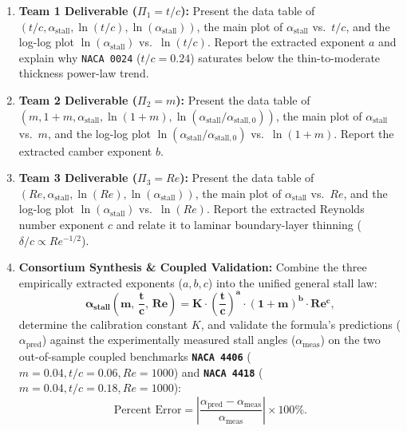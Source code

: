 \documentclass[11pt,a4paper]{article}
\begin{document}
\begin{enumerate}[leftmargin=*, itemsep=4pt]
    \item \textbf{Team 1 Deliverable ($\Pi_1 = t/c$):}
    Present the data table of $(t/c, \alpha_{\text{stall}}, \ln(t/c), \ln(\alpha_{\text{stall}}))$, the main plot of $\alpha_{\text{stall}}$ vs.\ $t/c$, and the log-log plot $\ln(\alpha_{\text{stall}})$ vs.\ $\ln(t/c)$. Report the extracted exponent $a$ and explain why \texttt{NACA 0024} ($t/c = 0.24$) saturates below the thin-to-moderate thickness power-law trend.

    \item \textbf{Team 2 Deliverable ($\Pi_2 = m$):}
    Present the data table of $(m, 1+m, \alpha_{\text{stall}}, \ln(1+m), \ln(\alpha_{\text{stall}}/\alpha_{\text{stall},0}))$, the main plot of $\alpha_{\text{stall}}$ vs.\ $m$, and the log-log plot $\ln(\alpha_{\text{stall}}/\alpha_{\text{stall},0})$ vs.\ $\ln(1+m)$. Report the extracted camber exponent $b$.

    \item \textbf{Team 3 Deliverable ($\Pi_3 = Re$):}
    Present the data table of $(Re, \alpha_{\text{stall}}, \ln(Re), \ln(\alpha_{\text{stall}}))$, the main plot of $\alpha_{\text{stall}}$ vs.\ $Re$, and the log-log plot $\ln(\alpha_{\text{stall}})$ vs.\ $\ln(Re)$. Report the extracted Reynolds number exponent $c$ and relate it to laminar boundary-layer thinning ($\delta/c \propto Re^{-1/2}$).

    \item \textbf{Consortium Synthesis \& Coupled Validation:}
    Combine the three empirically extracted exponents ($a, b, c$) into the unified general stall law:
    \begin{equation}
    \mathbf{\alpha_{\text{stall}}\!\left(m,\, \frac{t}{c},\, Re\right) = K \cdot \left(\frac{t}{c}\right)^a \cdot (1 + m)^b \cdot Re^c},
    \end{equation}
    determine the calibration constant $K$, and validate the formula's predictions ($\alpha_{\text{pred}}$) against the experimentally measured stall angles ($\alpha_{\text{meas}}$) on the two out-of-sample coupled benchmarks \textbf{\texttt{NACA 4406}} ($m = 0.04, t/c = 0.06, Re = 1000$) and \textbf{\texttt{NACA 4418}} ($m = 0.04, t/c = 0.18, Re = 1000$):
    \begin{equation}
    \text{Percent Error} = \left| \frac{\alpha_{\text{pred}} - \alpha_{\text{meas}}}{\alpha_{\text{meas}}} \right| \times 100\%.
    \end{equation}
\end{enumerate}
\end{document}
